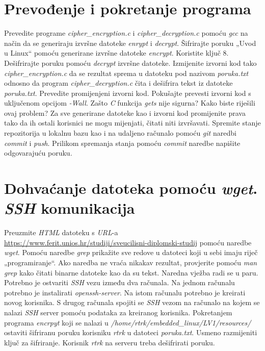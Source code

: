 \documentclass[11pt]{article}
\begin{document}
 \section{Prevođenje i pokretanje programa}
 Prevedite programe \textit{cipher\_encryption.c} i
 \textit{cipher\_decryption.c} pomoću \textit{gcc} na način da se generiraju
 izvršne datoteke \textit{enrypt} i \textit{decrypt}. Šifrirajte poruku
 „Uvod u Linux“ pomoću generirane izvršne datoteke \textit{encrypt}. Koristite
 ključ 8. Dešifrirajte poruku pomoću \textit{decrypt} izvršne datoteke.
 Izmijenite izvorni kod tako \textit{cipher\_encryption.c} da se rezultat
 sprema u datoteku pod nazivom \textit{poruka.txt} odnosno da program
 \textit{cipher\_decryption.c} čita i dešifrira tekst iz datoteke
 \textit{poruka.txt}. Prevedite promijenjeni izvorni kod.
\newline
\newline
Pokušajte prevesti izvorni kod s uključenom opcijom \textit{-Wall}. Zašto
 \textit{C} funkcija \textit{gets} nije sigurna? Kako biste riješili ovaj
 problem?
\newline
\newline
Za sve generirane datoteke kao i izvorni kod promijenite prava tako da ih
 ostali korisnici ne mogu mijenjati, čitati niti izvršavati.
\newline
\newline
Spremite stanje repozitorija u lokalnu bazu kao i na udaljeno računalo pomoću
 \textit{git} naredbi \textit{commit} i \textit{push}. Prilikom spremanja
 stanja pomoću \textit{commit} naredbe napišite odgovarajuću poruku.

 \section{Dohvaćanje datoteka pomoću \textit{wget}. \textit{SSH} komunikacija}
Preuzmite \textit{HTML} datoteku s \textit{URL}-a \\
\url{https://www.ferit.unios.hr/studiji/sveucilisni-diplomski-studij} pomoću
 naredbe \textit{wget}. Pomoću naredbe \textit{grep} prikažite sve redove u
 datoteci koji u sebi imaju riječ „programiranje“. Ako naredba ne vraća nikakav
 rezultat, provjerite pomoću \textit{man grep} kako čitati binarne datoteke kao
 da su tekst.
\newline
\newline
Naredna vježba radi se u paru. Potrebno je ostvariti \textit{SSH} vezu između
 dva računala. Na jednom računalu potrebno je instalirati
 \textit{openssh-server}. Na istom računalu potrebno je kreirati novog
 korisnika. S drugog računala spojiti se \textit{SSH} vezom na računalo na
 kojem se nalazi \textit{SSH} server pomoću podataka za kreiranog korisnika.
 Pokretanjem programa \textit{encrpyt} koji se nalazi u
 \textit{/home/rtrk/embedded\_linux/LV1/resources/} ostaviti šifriranu poruku
 korisniku \textit{rtrk} u datoteci \textit{poruka.txt}. Usmeno razmijeniti
 ključ za šifriranje. Korisnik \textit{rtrk} na serveru treba dešifrirati
 poruku.
\end{document}
